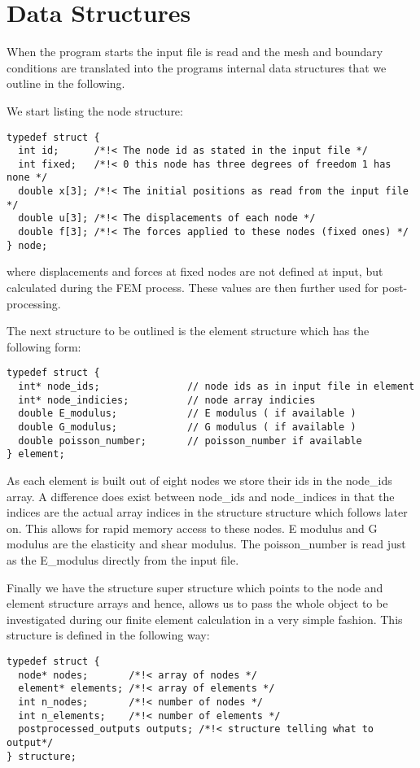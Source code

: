 \section{Data Structures}

When the program starts the input file is read and the mesh and
boundary conditions are translated into the programs internal data
structures that we outline in the following.

We start listing the node structure:
\begin{lstlisting}
typedef struct {
  int id;      /*!< The node id as stated in the input file */
  int fixed;   /*!< 0 this node has three degrees of freedom 1 has none */
  double x[3]; /*!< The initial positions as read from the input file */
  double u[3]; /*!< The displacements of each node */
  double f[3]; /*!< The forces applied to these nodes (fixed ones) */
} node;
\end{lstlisting}
where displacements and forces at fixed nodes are not defined at
input, but calculated during the FEM process. These values are then
further used for post-processing. 

The next structure to be outlined is the element structure which has
the following form:
\begin{lstlisting}
typedef struct {
  int* node_ids;               // node ids as in input file in element
  int* node_indicies;          // node array indicies
  double E_modulus;            // E modulus ( if available ) 
  double G_modulus;            // G modulus ( if available ) 
  double poisson_number;       // poisson_number if available
} element;                    
\end{lstlisting}
As each element is built out of eight nodes we store their ids in the
node\_ids array. A difference does exist between node\_ids and
node\_indices in that the indices are the actual array indices in
the structure structure which follows later on. This allows for rapid
memory access to these nodes. E modulus and G modulus are the
elasticity and shear modulus. The poisson\_number is
read just as the E\_modulus directly from the input
file. 

Finally we have the structure super structure which points to the
node and element structure arrays and hence, allows us to pass the
whole object to be investigated during our finite element calculation
in a very simple fashion. This structure is defined in the following
way:
\begin{lstlisting}
typedef struct {
  node* nodes;       /*!< array of nodes */
  element* elements; /*!< array of elements */
  int n_nodes;       /*!< number of nodes */
  int n_elements;    /*!< number of elements */
  postprocessed_outputs outputs; /*!< structure telling what to output*/
} structure;
\end{lstlisting}

